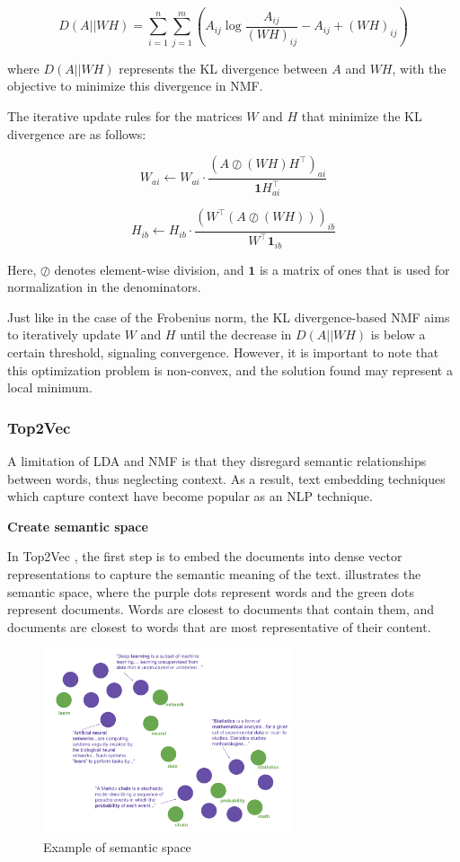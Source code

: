 \documentclass{article}
\begin{document}
\[
    D(A || WH) = \sum_{i=1}^{n} \sum_{j=1}^{m} \left( A_{ij} \log\frac{A_{ij}}{(WH)_{ij}} - A_{ij} + (WH)_{ij} \right)
\]

where \( D(A || WH) \) represents the KL divergence between \( A \) and \( WH \), with the objective to minimize this divergence in NMF.

The iterative update rules for the matrices \( W \) and \( H \) that minimize the KL divergence are as follows:

\[
    W_{ai} \leftarrow W_{ai} \cdot \frac{(A \oslash (WH)H^\top)_{ai}}{\mathbf{1}H^\top_{ai}}
\]

\[
    H_{ib} \leftarrow H_{ib} \cdot \frac{(W^\top(A \oslash (WH)))_{ib}}{W^\top\mathbf{1}_{ib}}
\]

Here, \( \oslash \) denotes element-wise division, and \( \mathbf{1} \) is a matrix of ones that is used for normalization in the denominators.

Just like in the case of the Frobenius norm, the KL divergence-based NMF aims to iteratively update \( W \) and \( H \) until the decrease in \( D(A || WH) \) is below a certain threshold, signaling convergence. However, it is important to note that this optimization problem is non-convex, and the solution found may represent a local minimum.




\subsubsection{Top2Vec}
A limitation of LDA and NMF is that they disregard semantic relationships between words, thus neglecting context. As a result, text embedding techniques which capture context have become popular as an NLP technique.

\textbf{Create semantic space}

In Top2Vec \cite{angelov_top2vec_2020}, the first step is to embed the documents into dense vector representations to capture the semantic meaning of the text.  illustrates the semantic space, where the purple dots represent words and the green dots represent documents. Words are closest to documents that contain them, and documents are closest to words that are most representative of their content.

\begin{figure}[h] %
    \centering
    \includegraphics[width=0.65\textwidth]{images/doc_word_embedding.pdf}
    \caption{Example of semantic space \cite{angelov_top2vec_2020}}
    \label{fig:doc_word_embedding}
\end{figure}
\end{document}
